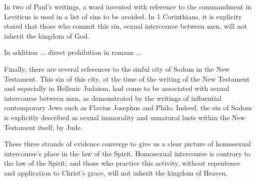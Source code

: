 \documentclass[10pt]{article}
\begin{document}
In two of Paul's writings, a word invented with reference to the commandment in Leviticus is used in a list of sins to be avoided. In 1 Corinthians, it is explicity stated that those who commit this sin, sexual intercourse between men, will not inherit the kingdom of God. 

In addition ... direct prohibition in romans ...

Finally, there are several references to the sinful city of Sodom in the New Testament. This sin of this city, at the time of the writing of the New Testament and especially in Hellenic Judaism, had come to be associated with sexual intercourse between men, as demonstrated by the writings of influential contemporary Jews such as Flavius Josephus and Philo. Indeed, the sin of Sodom is explicitly described as sexual immorality and unnatural lusts within the New Testament itself, by Jude. 

These three strands of evidence converge to give us a clear picture of homosexual intercourse's place in the law of the Spirit. Homosexual intercourse is contrary to the law of the Spirit; and those who practice this activity, without repentence and application to Christ's grace, will not inherit the kingdom of Heaven. 


\end{document}
